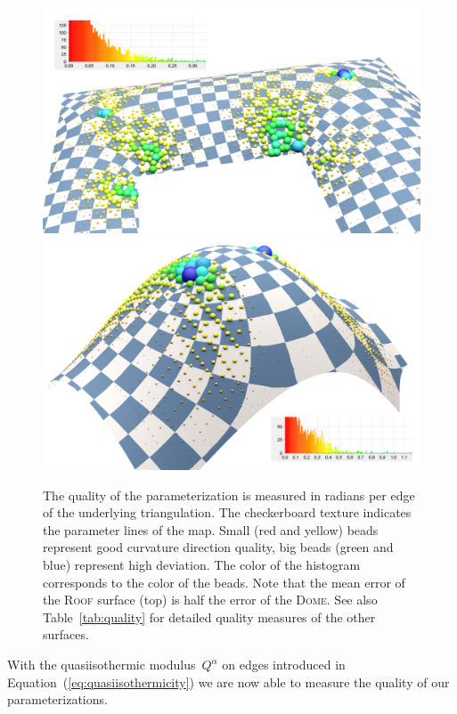 \begin{figure}
\centering
\includegraphics[width=\linewidth]{image/aag2012/dach01_quality_highres.png}
\includegraphics[width=\linewidth]{image/aag2012/dach02_quality_highres.png}
\caption{The quality of the parameterization is measured in radians per
edge of the underlying triangulation. The checkerboard texture indicates the parameter
lines of the map. Small (red and yellow) beads represent good curvature direction quality, big
beads (green and blue) represent high deviation. The color of the histogram
corresponds to the color of the beads. Note that the mean error of the \textsc{Roof} 
surface (top) is half the error of the \textsc{Dome}. See also Table~\ref{tab:quality} 
for detailed quality measures of the other surfaces.}
\label{fig:quality}
\end{figure}
With the quasiisothermic modulus~$Q^\alpha$ on edges introduced in
Equation~(\ref{eq:quasiisothermicity}) we are now able to measure the 
quality of our parameterizations. 



